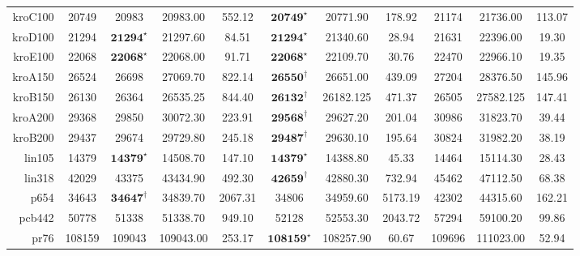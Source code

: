 \documentclass[12pt]{ctexart}
\begin{document}
\begin{table}[htbp]
\begin{tabular}{rcccccccccc}
        kroC100                       & 20749                             & 20983                       & 20983.00                               & 552.12           & $\textbf{20749}^\star$  & 20771.90         & 178.92           & 21174                 & 21736.00         & 113.07           \\
        kroD100&21294& $\textbf{21294}^\star$ &21297.60 &84.51 & $\textbf{21294}^\star$ &21340.60 &28.94 &21631&22396.00 &19.30 \\
kroE100&22068& $\textbf{22068}^\star$ &22068.00 &91.71 & $\textbf{22068}^\star$ &22109.70 &30.76 &22470&22966.10 &19.35 \\
        kroA150                       & 26524                             & 26698                       & 27069.70                               & 822.14           & $\textbf{26550}^\dag$   & 26651.00         & 439.09           & 27204                 & 28376.50         & 145.96           \\
        kroB150                       & 26130                             & 26364                       & 26535.25                               & 844.40           & $\textbf{26132}^\dag$   & 26182.125        & 471.37           & 26505                 & 27582.125        & 147.41           \\
        kroA200&29368&29850&30072.30 &223.91 & $\textbf{29568}^\dag$ &29627.20 &201.04 &30986&31823.70 &39.44 \\
kroB200&29437&29674&29729.80 &245.18 &$\textbf{29487}^\dag$&29630.10 &195.64 &30824&31982.20 &38.19 \\
        lin105                        & 14379                             & $\textbf{14379}^\star$      & 14508.70                               & 147.10           & $\textbf{14379}^\star$  & 14388.80         & 45.33            & 14464                 & 15114.30         & 28.43            \\
        lin318&42029&43375&43434.90 &492.30 & $\textbf{42659}^\dag$ &42880.30 &732.94 &45462&47112.50 &68.38 \\
p654&34643& $\textbf{34647}^\dag$ &34839.70 &2067.31 &34806&34959.60 &5173.19 &42302&44315.60 &162.21 \\
pcb442&50778&51338&51338.70 &949.10 &52128&52553.30 &2043.72 &57294&59100.20 &99.86 \\
        pr76                          & 108159                            & 109043                      & 109043.00                              & 253.17           & $\textbf{108159}^\star$ & 108257.90        & 60.67            & 109696                & 111023.00        & 52.94            \\

\end{tabular}
\end{table}
\end{document}
